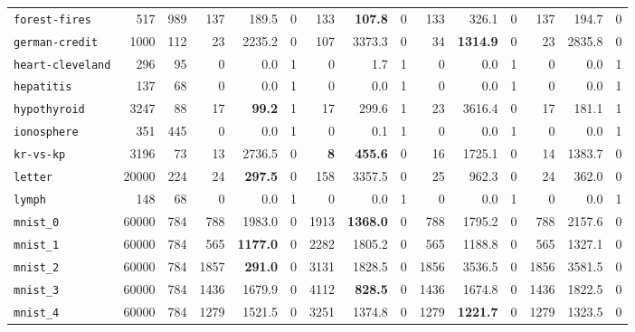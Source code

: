 \begin{tabular}{lccrrrrrrrrrrrr}
\texttt{forest-fires} & \multicolumn{1}{r}{517} & \multicolumn{1}{r}{989}  & 137 & 189.5 & 0 & 133 & \textbf{107.8} & 0 & 133 & 326.1 & 0 & 137 & 194.7 & 0\\
\texttt{german-credit} & \multicolumn{1}{r}{1000} & \multicolumn{1}{r}{112}  & 23 & 2235.2 & 0 & 107 & 3373.3 & 0 & 34 & \textbf{1314.9} & 0 & 23 & 2835.8 & 0\\
\texttt{heart-cleveland} & \multicolumn{1}{r}{296} & \multicolumn{1}{r}{95}  & 0 & 0.0 & 1 & 0 & 1.7 & 1 & 0 & 0.0 & 1 & 0 & 0.0 & 1\\
\texttt{hepatitis} & \multicolumn{1}{r}{137} & \multicolumn{1}{r}{68}  & 0 & 0.0 & 1 & 0 & 0.0 & 1 & 0 & 0.0 & 1 & 0 & 0.0 & 1\\
\texttt{hypothyroid} & \multicolumn{1}{r}{3247} & \multicolumn{1}{r}{88}  & 17 & \textbf{99.2} & 1 & 17 & 299.6 & 1 & 23 & 3616.4 & 0 & 17 & 181.1 & 1\\
\texttt{ionosphere} & \multicolumn{1}{r}{351} & \multicolumn{1}{r}{445}  & 0 & 0.0 & 1 & 0 & 0.1 & 1 & 0 & 0.0 & 1 & 0 & 0.0 & 1\\
\texttt{kr-vs-kp} & \multicolumn{1}{r}{3196} & \multicolumn{1}{r}{73}  & 13 & 2736.5 & 0 & \textbf{8} & \textbf{455.6} & 0 & 16 & 1725.1 & 0 & 14 & 1383.7 & 0\\
\texttt{letter} & \multicolumn{1}{r}{20000} & \multicolumn{1}{r}{224}  & 24 & \textbf{297.5} & 0 & 158 & 3357.5 & 0 & 25 & 962.3 & 0 & 24 & 362.0 & 0\\
\texttt{lymph} & \multicolumn{1}{r}{148} & \multicolumn{1}{r}{68}  & 0 & 0.0 & 1 & 0 & 0.0 & 1 & 0 & 0.0 & 1 & 0 & 0.0 & 1\\
\texttt{mnist\_0} & \multicolumn{1}{r}{60000} & \multicolumn{1}{r}{784}  & 788 & 1983.0 & 0 & 1913 & \textbf{1368.0} & 0 & 788 & 1795.2 & 0 & 788 & 2157.6 & 0\\
\texttt{mnist\_1} & \multicolumn{1}{r}{60000} & \multicolumn{1}{r}{784}  & 565 & \textbf{1177.0} & 0 & 2282 & 1805.2 & 0 & 565 & 1188.8 & 0 & 565 & 1327.1 & 0\\
\texttt{mnist\_2} & \multicolumn{1}{r}{60000} & \multicolumn{1}{r}{784}  & 1857 & \textbf{291.0} & 0 & 3131 & 1828.5 & 0 & 1856 & 3536.5 & 0 & 1856 & 3581.5 & 0\\
\texttt{mnist\_3} & \multicolumn{1}{r}{60000} & \multicolumn{1}{r}{784}  & 1436 & 1679.9 & 0 & 4112 & \textbf{828.5} & 0 & 1436 & 1674.8 & 0 & 1436 & 1822.5 & 0\\
\texttt{mnist\_4} & \multicolumn{1}{r}{60000} & \multicolumn{1}{r}{784}  & 1279 & 1521.5 & 0 & 3251 & 1374.8 & 0 & 1279 & \textbf{1221.7} & 0 & 1279 & 1323.5 & 0\\

\end{tabular}
